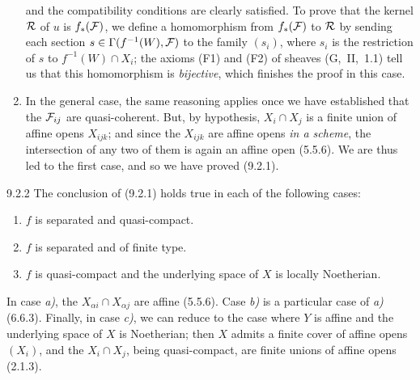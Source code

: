 \documentclass[../main.tex]{subfiles}
\begin{document}
\begin{enumerate}[label=\alph*)]
\begin{equation*}
        \end{equation*}
        and the compatibility conditions are clearly satisfied.
        To prove that the kernel $\mathcal{R}$ of $u$ is $f_*(\mathcal{F})$, we define a homomorphism from $f_*(\mathcal{F})$ to $\mathcal{R}$ by sending each section $s\in\Gamma(f^{-1}(W), \mathcal{F})$ to the family $(s_i)$, where $s_i$ is the restriction of $s$ to $f^{-1}(W)\cap X_i$; the axioms (F1) and (F2) of sheaves (G,~II,~1.1) tell us that this homomorphism is \emph{bijective}, which finishes the proof in this case.
    \item In the general case, the same reasoning applies once we have established that the $\mathcal{F}_{ij}$ are quasi-coherent.
    But, by hypothesis, $X_i\cap X_j$ is a finite union of affine opens $X_{ijk}$; and since the $X_{ijk}$ are affine opens \emph{in a scheme}, the intersection of any two of them is again an affine open (5.5.6).
    We are thus led to the first case, and so we have proved (9.2.1).
\end{enumerate}

\begin{env}[Corollary]{9.2.2}
    The conclusion of {\normalfont(9.2.1)} holds true in each of the following cases:
    \begin{enumerate}[label=\alph*)]
        \item $f$ is separated and quasi-compact.
        \item $f$ is separated and of finite type.
        \item $f$ is quasi-compact and the underlying space of $X$ is locally Noetherian.
    \end{enumerate}
\end{env}

In case \emph{a)}, the $X_{\alpha i}\cap X_{\alpha j}$ are affine (5.5.6).
Case \emph{b)} is a particular case of \emph{a)} (6.6.3).
Finally, in case \emph{c)}, we can reduce to the case where $Y$ is affine and the underlying space of $X$ is Noetherian; then $X$ admits a finite cover of affine opens $(X_i)$, and the $X_i\cap X_j$, being quasi-compact, are finite unions of affine opens (2.1.3).
\end{document}
